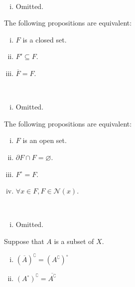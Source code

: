 \documentclass{report}
\begin{document}
\begin{prf}~\\ \vspace{-1em}
	\begin{enumerate}[(i)] 
		\item Omitted.
	\end{enumerate}
\end{prf}


\begin{proposition}{}{}
	The following propositions are equivalent:
	\begin{enumerate}[(i)] 
		\item $F$ is a closed set.
		\item $F'\subseteq F$.
		\item $\overline{F}=F$.
	\end{enumerate}
\end{proposition}

\begin{prf}~\\ \vspace{-1em}
	\begin{enumerate}[(i)] 
		\item Omitted.
	\end{enumerate}
\end{prf}


\begin{proposition}{}{}
	The following propositions are equivalent:
	\begin{enumerate}[(i)] 
		\item $F$ is an open set.
		\item $\partial F\cap F=\varnothing$.
		\item $F^\circ=F$.
		\item $\forall x\in F,F\in \mathcal{N}(x)$.
	\end{enumerate}
\end{proposition}

\begin{prf}~\\ \vspace{-1em}
	\begin{enumerate}[(i)] 
		\item Omitted.
	\end{enumerate}
\end{prf}


\begin{proposition}{}{}
	Suppose that $A$ is a subset of $X$.
	\begin{enumerate}[(i)] 
		\item $(\overline{A})^{\complement}=(A^{\complement})^{\circ}$
		\item $(A^{\circ})^{\complement}=\overline{A^{\complement}}$
	\end{enumerate}
\end{proposition}
\end{document}
